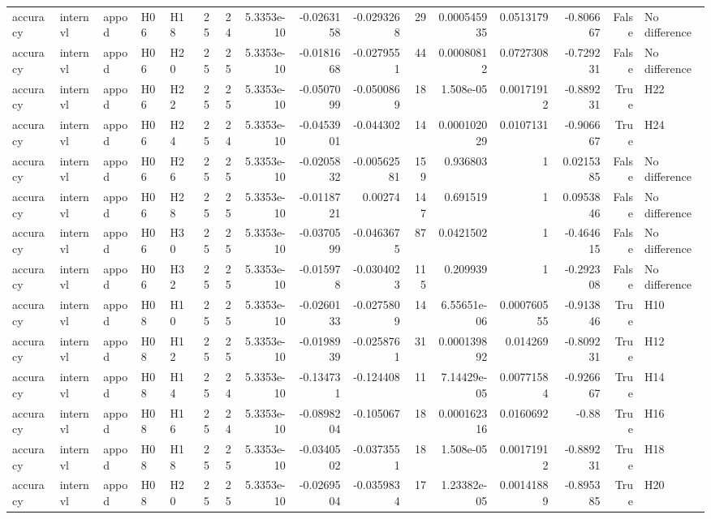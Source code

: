 \begin{longtable}{lllllrrrrrrrrrrl}
accuracy & internvl & appod & H06 & H18 & 25 & 24 & 5.3353e-10 & -0.0263158 & -0.0293268 & 29 & 0.000545935 & 0.0513179 & -0.806667 & False & No difference \\
accuracy & internvl & appod & H06 & H20 & 25 & 25 & 5.3353e-10 & -0.0181668 & -0.0279551 & 44 & 0.00080812 & 0.0727308 & -0.729231 & False & No difference \\
accuracy & internvl & appod & H06 & H22 & 25 & 25 & 5.3353e-10 & -0.0507099 & -0.0500869 & 18 & 1.508e-05 & 0.00171912 & -0.889231 & True & H22 \\
accuracy & internvl & appod & H06 & H24 & 25 & 24 & 5.3353e-10 & -0.0453901 & -0.044302 & 14 & 0.000102029 & 0.0107131 & -0.906667 & True & H24 \\
accuracy & internvl & appod & H06 & H26 & 25 & 25 & 5.3353e-10 & -0.0205832 & -0.00562581 & 159 & 0.936803 & 1 & 0.0215385 & False & No difference \\
accuracy & internvl & appod & H06 & H28 & 25 & 25 & 5.3353e-10 & -0.0118721 & 0.00274 & 147 & 0.691519 & 1 & 0.0953846 & False & No difference \\
accuracy & internvl & appod & H06 & H30 & 25 & 25 & 5.3353e-10 & -0.0370599 & -0.0463675 & 87 & 0.0421502 & 1 & -0.464615 & False & No difference \\
accuracy & internvl & appod & H06 & H32 & 25 & 25 & 5.3353e-10 & -0.015978 & -0.0304023 & 115 & 0.209939 & 1 & -0.292308 & False & No difference \\
accuracy & internvl & appod & H08 & H10 & 25 & 25 & 5.3353e-10 & -0.0260133 & -0.0275809 & 14 & 6.55651e-06 & 0.000760555 & -0.913846 & True & H10 \\
accuracy & internvl & appod & H08 & H12 & 25 & 25 & 5.3353e-10 & -0.0198939 & -0.0258761 & 31 & 0.000139892 & 0.014269 & -0.809231 & True & H12 \\
accuracy & internvl & appod & H08 & H14 & 25 & 24 & 5.3353e-10 & -0.134731 & -0.124408 & 11 & 7.14429e-05 & 0.00771584 & -0.926667 & True & H14 \\
accuracy & internvl & appod & H08 & H16 & 25 & 24 & 5.3353e-10 & -0.0898204 & -0.105067 & 18 & 0.000162316 & 0.0160692 & -0.88 & True & H16 \\
accuracy & internvl & appod & H08 & H18 & 25 & 25 & 5.3353e-10 & -0.0340502 & -0.0373551 & 18 & 1.508e-05 & 0.00171912 & -0.889231 & True & H18 \\
accuracy & internvl & appod & H08 & H20 & 25 & 25 & 5.3353e-10 & -0.0269504 & -0.0359834 & 17 & 1.23382e-05 & 0.00141889 & -0.895385 & True & H20 \\

\end{longtable}
